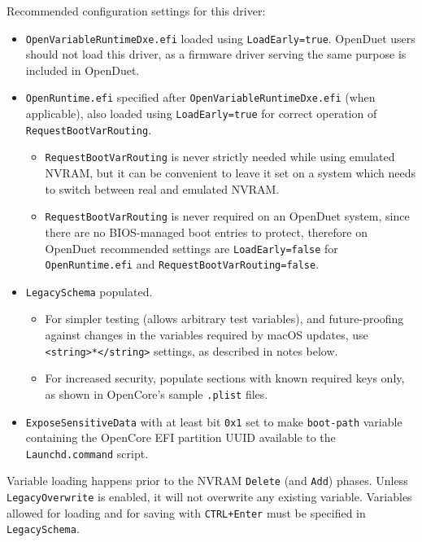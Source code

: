 \documentclass[]{article}
\providecommand{\tightlist}{%
  \setlength{\itemsep}{0pt}\setlength{\parskip}{0pt}}
\begin{document}
Recommended configuration settings for this driver:

\begin{itemize}
\tightlist
  \item \texttt{OpenVariableRuntimeDxe.efi} loaded using \texttt{LoadEarly=true}. OpenDuet users
  should not load this driver, as a firmware driver serving the same purpose is included in OpenDuet.
  \item \texttt{OpenRuntime.efi} specified after \texttt{OpenVariableRuntimeDxe.efi} (when applicable),
  also loaded using \texttt{LoadEarly=true} for correct operation of \texttt{RequestBootVarRouting}.
  \begin{itemize}
  \tightlist
    \item \texttt{RequestBootVarRouting} is never strictly needed while using emulated NVRAM, but
    it can be convenient to leave it set on a system which needs to switch between real and emulated NVRAM.
    \item \texttt{RequestBootVarRouting} is never required on an OpenDuet system, since there are
    no BIOS-managed boot entries to protect, therefore on OpenDuet recommended settings are
    \texttt{LoadEarly=false} for \texttt{OpenRuntime.efi} and \texttt{RequestBootVarRouting=false}.
  \end{itemize}
  \item \texttt{LegacySchema} populated.
  \begin{itemize}
  \tightlist
    \item For simpler testing (allows arbitrary test variables), and future-proofing against
    changes in the variables required by macOS updates, use \texttt{<string>*</string>} settings, as
    described in notes below.
    \item For increased security, populate sections with known required keys only, as shown in OpenCore's
    sample \texttt{.plist} files.
  \end{itemize}
  \item \texttt{ExposeSensitiveData} with at least bit \texttt{0x1} set to make \texttt{boot-path}
  variable containing the OpenCore EFI partition UUID available to the \texttt{Launchd.command} script.
\end{itemize}

Variable loading happens prior to the NVRAM \texttt{Delete} (and \texttt{Add}) phases. Unless
\texttt{LegacyOverwrite} is enabled, it will not overwrite any existing variable.
Variables allowed for loading and for saving with \texttt{CTRL+Enter} must be specified in \texttt{LegacySchema}.
\end{document}
